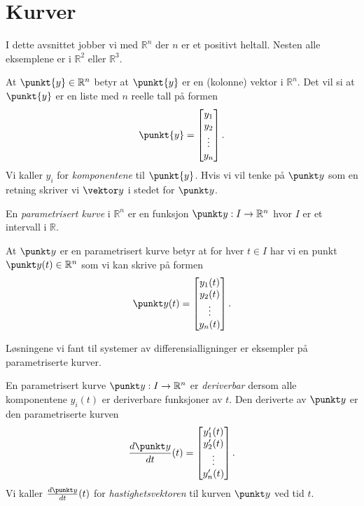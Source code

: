 \section{Kurver}

I dette avsnittet jobber vi med $\mathbb{R}^n$ der $n$ er et positivt heltall. Nesten
alle eksemplene er i $\mathbb{R}^2$ eller $\mathbb{R}^3$.

At $\punkt{y} \in \mathbb{R}^n$ betyr at $\punkt{y}$ er en (kolonne) vektor i $\mathbb{R}^n$.
Det vil si at $\punkt{y}$ er en liste med $n$ reelle tall på formen
$$\punkt{y} = \begin{bmatrix} y_1 \\ y_2 \\ \vdots \\ y_n \end{bmatrix}.$$
Vi kaller $y_i$ for {\em komponentene} til $\punkt{y}$.
Hvis vi vil tenke på $\punkt y$ som en retning skriver vi $\vektor y$ i stedet for $\punkt y$.

\begin{definisjon}
  En {\em parametrisert kurve} i $\mathbb{R}^n$ er en funksjon $\punkt y: I \to
  \mathbb{R}^n$ hvor $I$ er et intervall i $\mathbb{R}$.
\end{definisjon}

At $\punkt y$ er en parametrisert kurve betyr at for hver $t \in I$ har vi en punkt $\punkt y(t) \in \mathbb{R}^n$
som vi kan skrive på formen
$$\punkt y(t) = \begin{bmatrix} y_1(t) \\ y_2(t) \\ \vdots \\ y_n(t) \end{bmatrix}.$$

\begin{eksempel}
  Løsningene vi fant til systemer av differensialligninger er eksempler på parametriserte kurver.
\end{eksempel}

\begin{definisjon}
  En parametrisert kurve $\punkt y: I \to \mathbb   {R}^n $ er {\em deriverbar}
  dersom alle komponentene $y_i(t)$ er deriverbare funksjoner av $t$.
  Den deriverte av $\punkt y$ er den parametriserte kurven
  $$\frac{d \punkt y}{dt}(t) = \begin{bmatrix} y_1'(t) \\ y_2'(t) \\ \vdots \\ y_n'(t) \end{bmatrix}.$$
  Vi kaller $\frac{d \punkt y}{dt}(t)$ for {\em hastighetsvektoren} til kurven $\punkt y$ ved tid $t$.
\end{definisjon}


